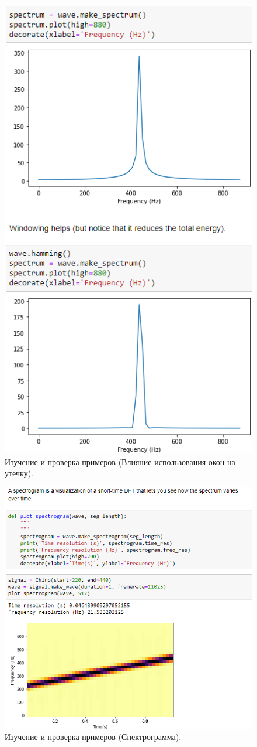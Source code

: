 \documentclass[a4paper, 14pt]{extarticle}
\begin{document}
    \begin{figure}[H]
        \centering
        \includegraphics[width=0.75\linewidth]{resources/Images/task1_check_leakage}
        \caption{Изучение и проверка примеров (Влияние использования окон на утечку).}
        \label{fig:task1_check_leakage}
    \end{figure}

    \begin{figure}[H]
        \centering
        \includegraphics[width=0.75\linewidth]{resources/Images/task1_check_spectrogram}
        \caption{Изучение и проверка примеров (Спектрограмма).}
        \label{fig:task1_check_spectrogram}
    \end{figure}
\end{document}
